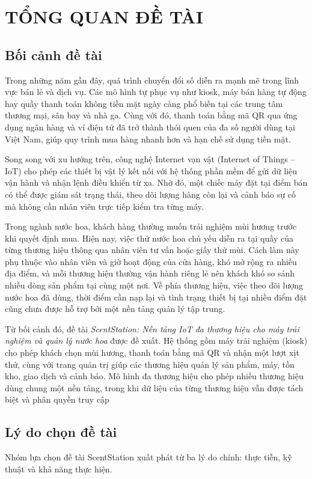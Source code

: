 \chapter{TỔNG QUAN ĐỀ TÀI}
\section{Bối cảnh đề tài}
Trong những năm gần đây, quá trình chuyển đổi số diễn ra mạnh mẽ trong lĩnh vực bán lẻ và dịch vụ. Các mô hình tự phục vụ như kiosk, máy bán hàng tự động hay quầy thanh toán không tiền mặt ngày càng phổ biến tại các trung tâm thương mại, sân bay và nhà ga. Cùng với đó, thanh toán bằng mã QR qua ứng dụng ngân hàng và ví điện tử đã trở thành thói quen của đa số người dùng tại Việt Nam, giúp quy trình mua hàng nhanh hơn và hạn chế sử dụng tiền mặt.
 
Song song với xu hướng trên, công nghệ Internet vạn vật (Internet of Things -- IoT) cho phép các thiết bị vật lý kết nối với hệ thống phần mềm để gửi dữ liệu vận hành và nhận lệnh điều khiển từ xa. Nhờ đó, một chiếc máy đặt tại điểm bán có thể được giám sát trạng thái, theo dõi lượng hàng còn lại và cảnh báo sự cố mà không cần nhân viên trực tiếp kiểm tra từng máy.
 
Trong ngành nước hoa, khách hàng thường muốn trải nghiệm mùi hương trước khi quyết định mua. Hiện nay, việc thử nước hoa chủ yếu diễn ra tại quầy của từng thương hiệu thông qua nhân viên tư vấn hoặc giấy thử mùi. Cách làm này phụ thuộc vào nhân viên và giờ hoạt động của cửa hàng, khó mở rộng ra nhiều địa điểm, và mỗi thương hiệu thường vận hành riêng lẻ nên khách khó so sánh nhiều dòng sản phẩm tại cùng một nơi. Về phía thương hiệu, việc theo dõi lượng nước hoa đã dùng, thời điểm cần nạp lại và tình trạng thiết bị tại nhiều điểm đặt cũng chưa được hỗ trợ bởi một nền tảng quản lý tập trung.
 
Từ bối cảnh đó, đề tài \textit{ScentStation: Nền tảng IoT đa thương hiệu cho máy trải nghiệm và quản lý nước hoa} được đề xuất. Hệ thống gồm máy trải nghiệm (kiosk) cho phép khách chọn mùi hương, thanh toán bằng mã QR và nhận một lượt xịt thử, cùng với trang quản trị giúp các thương hiệu quản lý sản phẩm, máy, tồn kho, giao dịch và cảnh báo. Mô hình đa thương hiệu cho phép nhiều thương hiệu dùng chung một nền tảng, trong khi dữ liệu của từng thương hiệu vẫn được tách biệt và phân quyền truy cập 
\section{Lý do chọn đề tài}
Nhóm lựa chọn đề tài ScentStation xuất phát từ ba lý do chính: thực tiễn, kỹ thuật và khả năng thực hiện.
 
